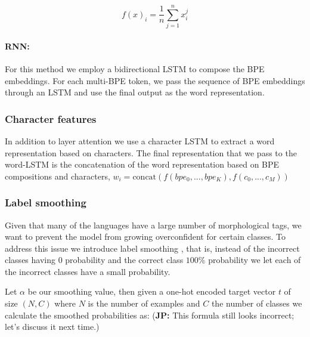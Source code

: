 \documentclass[11pt]{article}
\newcommand\jp[1]{(\textbf{JP:} #1)}
\begin{document}
	\begin{equation}
	f(x)_{i} = \frac{1}{n}\sum_{j=1}^{n} x_i^j
	\end{equation}
	
	
	\paragraph{RNN:} For this method we employ a bidirectional LSTM
        to compose the BPE embeddings. For each multi-BPE
        token, we pass the sequence of BPE embeddings through an LSTM
        and use the final output as the word representation. 
    
	\subsubsection{Character features}
    	In addition to layer attention we use a character LSTM to
     extract a word representation based on characters. The final
     representation that we pass to the word-LSTM is the concatenation
     of the word representation based on BPE compositions and
     characters,
     $w_i = \text{concat}(f(bpe_0,...,bpe_K), f(c_0, ..., c_M))$
	
	\subsubsection{Label smoothing}
    	Given that many of the languages have a large number of
     morphological tags, we want to prevent the model from growing
     overconfident for certain classes. To address this issue we
     introduce label smoothing \cite{szegedy2016rethinking}, that is,
     instead of the incorrect classes having 0 probability and the
     correct class $100\%$ probability we let each of the incorrect
     classes have a small probability.


                Let $\alpha$ be our smoothing value, then given a
     one-hot encoded target vector $t$ of size $(N,C)$ where $N$ is
     the number of examples and $C$ the number of classes we calculate
     the smoothed probabilities as:
     \jp{This formula still looks incorrect; let's discuss it next time.}
\end{document}
